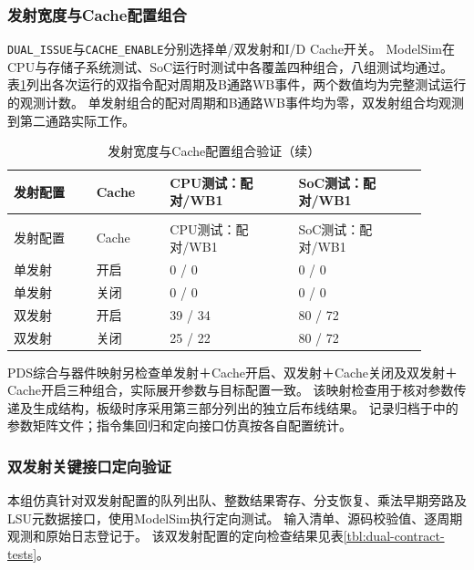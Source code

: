 \subsubsection{发射宽度与Cache配置组合}

\texttt{DUAL\_ISSUE}与\texttt{CACHE\_ENABLE}分别选择单/双发射和I/D Cache开关。
ModelSim在CPU与存储子系统测试、SoC运行时测试中各覆盖四种组合，八组测试均通过。
表\ref{tbl:cpu-config-matrix}列出各次运行的双指令配对周期及B通路WB事件，两个数值均为完整测试运行的观测计数。
单发射组合的配对周期和B通路WB事件均为零，双发射组合均观测到第二通路实际工作。

\begin{reporttable}
\begin{longtable}{@{}p{0.18\linewidth}p{0.16\linewidth}p{0.28\linewidth}p{0.28\linewidth}@{}}
\caption{发射宽度与Cache配置组合验证}\label{tbl:cpu-config-matrix}\\
\toprule
发射配置 & Cache & CPU测试：配对/WB1 & SoC测试：配对/WB1 \\
\midrule
\endfirsthead
\caption[]{发射宽度与Cache配置组合验证（续）}\\
\toprule
发射配置 & Cache & CPU测试：配对/WB1 & SoC测试：配对/WB1 \\
\midrule
\endhead
\bottomrule
\endfoot
单发射 & 开启 & 0 / 0 & 0 / 0 \\
单发射 & 关闭 & 0 / 0 & 0 / 0 \\
双发射 & 开启 & 39 / 34 & 80 / 72 \\
双发射 & 关闭 & 25 / 22 & 80 / 72 \\
\end{longtable}
\end{reporttable}

PDS综合与器件映射另检查单发射＋Cache开启、双发射＋Cache关闭及双发射＋Cache开启三种组合，实际展开参数与目标配置一致。
该映射检查用于核对参数传递及生成结构，板级时序采用第三部分列出的独立后布线结果。
记录归档于中的参数矩阵文件；指令集回归和定向接口仿真按各自配置统计。

\subsubsection{双发射关键接口定向验证}

本组仿真针对双发射配置的队列出队、整数结果寄存、分支恢复、乘法早期旁路及LSU元数据接口，使用ModelSim执行定向测试。
输入清单、源码校验值、逐周期观测和原始日志登记于。
该双发射配置的定向检查结果见表\ref{tbl:dual-contract-tests}。

